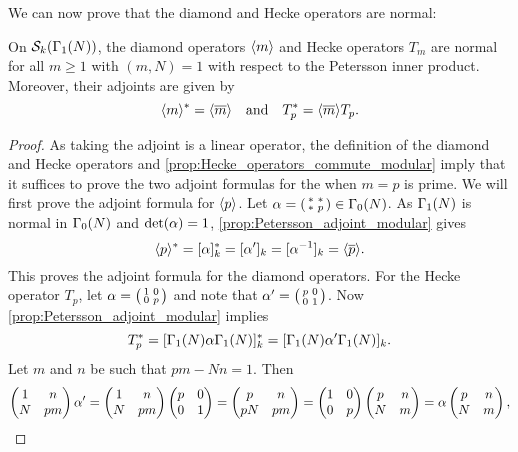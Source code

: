       We can now prove that the diamond and Hecke operators are normal:

      \begin{proposition}\label{prop:Hecke_operators_normal_modular}
        On $\mathcal{S}_{k}(\Gamma_{1}(N))$, the diamond operators $\langle m\rangle$ and Hecke operators $T_{m}$ are normal for all $m \ge 1$ with $(m,N) = 1$ with respect to the Petersson inner product. Moreover, their adjoints are given by
        \[
          \langle m\rangle^{\ast} = \langle\overline{m}\rangle \quad \text{and} \quad T_{p}^{\ast} = \langle\overline{m}\rangle T_{p}.
        \]
      \end{proposition}
      \begin{proof}
        As taking the adjoint is a linear operator, the definition of the diamond and Hecke operators and \cref{prop:Hecke_operators_commute_modular} imply that it suffices to prove the two adjoint formulas for the when $m = p$ is prime. We will first prove the adjoint formula for $\langle p\rangle$. Let $\alpha = \begin{psmallmatrix} * & * \\ * & p \end{psmallmatrix} \in \Gamma_{0}(N)$. As $\Gamma_{1}(N)$ is normal in $\Gamma_{0}(N)$ and $\det(\alpha) = 1$, \cref{prop:Petersson_adjoint_modular} gives
        \[
          \langle p\rangle^{\ast} = [\alpha]_{k}^{\ast} = [\alpha']_{k} = [\alpha^{-1}]_{k} = \langle\overline{p}\rangle.
        \]
        This proves the adjoint formula for the diamond operators. For the Hecke operator $T_{p}$, let $\alpha = \begin{psmallmatrix} 1 & 0 \\ 0 & p \end{psmallmatrix}$ and note that $\alpha' = \begin{psmallmatrix} p & 0 \\ 0 & 1 \end{psmallmatrix}$. Now \cref{prop:Petersson_adjoint_modular} implies
        \[
          T_{p}^{\ast} = [\Gamma_{1}(N)\alpha\Gamma_{1}(N)]_{k}^{\ast} = [\Gamma_{1}(N)\alpha'\Gamma_{1}(N)]_{k}.
        \]
        Let $m$ and $n$ be such that $pm-Nn = 1$. Then
        \[
          \begin{pmatrix} 1 & n \\ N & pm \end{pmatrix}\alpha' = \begin{pmatrix} 1 & n \\ N & pm \end{pmatrix}\begin{pmatrix} p & 0 \\ 0 & 1 \end{pmatrix} = \begin{pmatrix} p & n \\ pN & pm \end{pmatrix} = \begin{pmatrix} 1 & 0 \\ 0 & p \end{pmatrix}\begin{pmatrix} p & n \\ N & m \end{pmatrix} = \alpha\begin{pmatrix} p & n \\ N & m \end{pmatrix},
\]
\end{proof}

